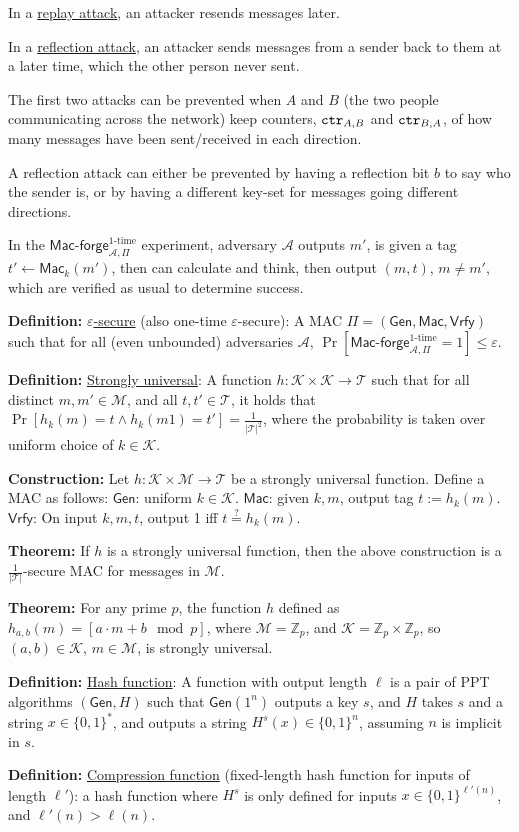 \documentclass[10pt]{article}
\newcommand{\Z}{\mathbb{Z}}
\newcommand{\AAA}{\mathcal{A}}
\newcommand{\KKK}{\mathcal{K}}
\newcommand{\MMM}{\mathcal{M}}
\newcommand{\TTT}{\mathcal{T}}
\newcommand{\defn}[1]{{\bf Definition:} \underline{#1}}
\newcommand{\thm}[1]{{\bf Theorem:} \underline{#1}}
\newcommand{\con}[1]{{\bf Construction:} \underline{#1}}
\newcommand{\Mac}{\mathsf{Mac}}
\newcommand{\Macf}{\mathsf{Mac\text{-}forge}}
\newcommand{\Vrfy}{\mathsf{Vrfy}}
\newcommand{\Gen}{\mathsf{Gen}}
\newcommand{\GenMacVrfy}{(\Gen,\Mac,\Vrfy)}
\newcommand{\ctr}{{\tt ctr}}
\newcommand{\from}{\leftarrow}
\begin{document}
\begin{multicols}{4}
In a \underline{replay attack}, an attacker resends messages later.

In a \underline{reflection attack}, an attacker sends messages from a sender back to them at a later time, which the other person never sent.

The first two attacks can be prevented when $A$ and $B$ (the two people communicating across the network) keep counters, $\ctr_{A,B}$ and $\ctr_{B,A}$, of how many messages have been sent/received in each direction.

A reflection attack can either be prevented by having a reflection bit $b$ to say who the sender is, or by having a different key-set for messages going different directions.

In the $\Macf_{\AAA,\Pi}^{\text{1-time}}$ experiment, adversary $\AAA$ outputs $m'$, is given a tag $t'\from\Mac_k(m')$, then can calculate and think, then output $(m,t)$, $m\neq m'$, which are verified as usual to determine success.

\defn{$\varepsilon$-secure} (also one-time $\varepsilon$-secure): A MAC $\Pi=\GenMacVrfy$ such that for all (even unbounded) adversaries $\AAA$, $\Pr[\Macf_{\AAA,\Pi}^{\text{1-time}}=1]\leq\varepsilon$.

\defn{Strongly universal}: A function $h:\KKK\times\KKK\to\TTT$ such that for all distinct $m,m'\in\MMM$, and all $t,t'\in\TTT$, it holds that $\Pr[h_k(m)=t\wedge h_k(m1)=t']=\frac{1}{|\TTT|^2}$, where the probability is taken over uniform choice of $k\in\KKK$.

\con{}Let $h:\KKK\times\MMM\to\TTT$ be a strongly universal function. Define a MAC as follows: $\Gen$: uniform $k\in\KKK$. $\Mac$: given $k,m$, output tag $t:=h_k(m)$. $\Vrfy$: On input $k,m,t$, output 1 iff $t\overset{?}{=}h_k(m)$.

\thm{}If $h$ is a strongly universal function, then the above construction is a $\frac{1}{|\TTT|}$-secure MAC for messages in $\MMM$.

\thm{}For any prime $p$, the function $h$ defined as $h_{a,b}(m)=[a\cdot m+b\mod{p}]$, where $\MMM=\Z_p$, and $\KKK=\Z_p\times\Z_p$, so $(a,b)\in\KKK$, $m\in\MMM$, is strongly universal.

\defn{Hash function}: A function with output length $\ell$ is a pair of PPT algorithms $(\Gen, H)$ such that $\Gen(1^n)$ outputs a key $s$, and $H$ takes $s$ and a string $x\in\{0,1\}^*$, and outputs a string $H^s(x)\in\{0,1\}^n$, assuming $n$ is implicit in $s$.

\defn{Compression function} (fixed-length hash function for inputs of length $\ell'$): a hash function where $H^s$ is only defined for inputs $x\in\{0,1\}^{\ell'(n)}$, and $\ell'(n)>\ell(n)$.


\end{multicols}
\end{document}
